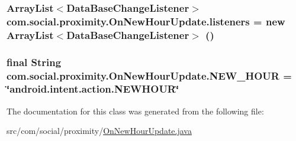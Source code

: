 \subsubsection[{listeners}]{\setlength{\rightskip}{0pt plus 5cm}Array\+List$<${\bf Data\+Base\+Change\+Listener}$>$ com.\+social.\+proximity.\+On\+New\+Hour\+Update.\+listeners = new Array\+List$<${\bf Data\+Base\+Change\+Listener}$>$ ()\hspace{0.3cm}{\ttfamily [private]}}\label{classcom_1_1social_1_1proximity_1_1_on_new_hour_update_afd3e5f40366b5d77fe49e17a00fb3cb1}
\hypertarget{classcom_1_1social_1_1proximity_1_1_on_new_hour_update_a4d16e6c5468afd333dc75b972efc05e9}{}
\subsubsection[{N\+E\+W\+\_\+\+H\+O\+U\+R}]{\setlength{\rightskip}{0pt plus 5cm}final String com.\+social.\+proximity.\+On\+New\+Hour\+Update.\+N\+E\+W\+\_\+\+H\+O\+U\+R = \char`\"{}android.\+intent.\+action.\+N\+E\+W\+H\+O\+U\+R\char`\"{}\hspace{0.3cm}{\ttfamily [static]}}\label{classcom_1_1social_1_1proximity_1_1_on_new_hour_update_a4d16e6c5468afd333dc75b972efc05e9}


The documentation for this class was generated from the following file\+:\begin{DoxyCompactItemize}
\item 
src/com/social/proximity/\hyperlink{_on_new_hour_update_8java}{On\+New\+Hour\+Update.\+java}\end{DoxyCompactItemize}
